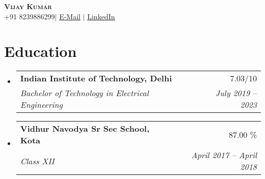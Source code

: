 \documentclass[letterpaper,11pt]{article}
\makeatletter
\newcommand{\resumeSubheading}[4]{
  \vspace{-2pt}\item
    \begin{tabular*}{0.97\textwidth}[t]{l@{\extracolsep{\fill}}r}
      \textbf{#1} & #2 \\
      \textit{\small#3} & \textit{\small #4} \\
    \end{tabular*}\vspace{-7pt}
}
\newcommand{\resumeSubHeadingListStart}{\begin{itemize}[leftmargin=0.15in, label={}]}
\newcommand{\resumeSubHeadingListEnd}{\end{itemize}}
\makeatother
\begin{document}
\begin{center}
    \textbf{\Huge \scshape Vijay Kumar } \\ \vspace{5pt}
    \small+91 8239886299$|$ \href{mailto:vijayk30606@gmail.com}{\underline{E-Mail}} $|$ 
    \href{https://www.linkedin.com/in/vijay-kumar-6a32101b1}{\underline{LinkedIn}}
\end{center}

\section{Education}
  \resumeSubHeadingListStart
    \resumeSubheading
      {Indian Institute of Technology, Delhi}{7.03/10}
      {Bachelor of Technology in Electrical Engineering}{July 2019 -- 2023}
    \resumeSubheading
      {Vidhur Navodya Sr Sec School, Kota}{87.00 \%}
      {Class XII}{April 2017 -- April 2018}
  \resumeSubHeadingListEnd



\end{document}
